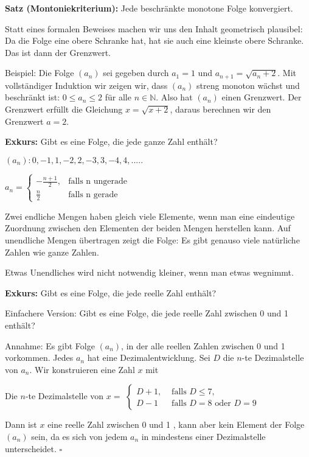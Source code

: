 \begin{frame}[fragile]
\textbf{Satz (Montoniekriterium):} Jede beschränkte monotone Folge konvergiert. \pause

Statt eines formalen Beweises machen wir uns den Inhalt geometrisch plausibel: \pause Da die Folge eine obere Schranke hat, hat sie auch eine kleinste obere Schranke. Das ist dann der Grenzwert. \pause

Beispiel: Die Folge $(a_n)$ sei gegeben durch $a_1 = 1$ und $a_{n+1} = \sqrt{a_n+2}$. Mit vollständiger Induktion wir zeigen wir, dass $(a_n)$ streng monoton wächst und beschränkt ist: $0 \le a_n \le 2$ für alle $n \in \mathbb{N}$. \pause
Also hat $(a_n)$ einen Grenzwert. \pause Der Grenzwert erfüllt die Gleichung $x = \sqrt{x+2}$,  daraus berechnen wir den Grenzwert $a = 2$. 

\end{frame}

\begin{frame}[fragile]
\textbf{Exkurs:} Gibt es eine Folge, die jede ganze Zahl enthält? \pause

$(a_n): 0,-1,1,-2,2,-3,3,-4,4,..... $ \pause

$a_n=\begin{cases}
 -\frac{n+1}{2},  & \text{falls n ungerade}\\
\frac{n}{2} & \text{falls n gerade }
\end{cases} $  \pause

Zwei endliche Mengen haben gleich viele Elemente, wenn man eine eindeutige Zuordnung zwischen den Elementen der beiden Mengen herstellen kann. \pause Auf unendliche Mengen übertragen zeigt die Folge: Es gibt genauso viele natürliche Zahlen wie ganze Zahlen. \pause

Etwas Unendliches wird nicht notwendig kleiner, wenn man etwas wegnimmt.

\end{frame}


\begin{frame}[fragile]
\textbf{Exkurs:} Gibt es eine Folge, die jede reelle Zahl enthält? \pause 

Einfachere Version: Gibt es eine Folge, die jede reelle Zahl zwischen 0 und 1 enthält? \pause

Annahme: Es gibt Folge $(a_n)$, in der alle reellen Zahlen zwischen 0 und 1 vorkommen. \pause Jedes $a_n$ hat eine Dezimalentwicklung. \pause Sei $D$ die $n$-te Dezimalstelle von $a_n$. \pause Wir konstruieren eine Zahl $x$ mit

Die $n$-te Dezimalstelle von $x = $ 
$\begin{cases}
D+1,  & \text{ falls } D \le 7,\\
D-1  & \text{ falls } D=8 \text{ oder } D=9 
\end{cases} $   \pause

Dann ist $x$ eine reelle Zahl zwischen 0 und 1 \pause, kann aber kein Element der Folge $(a_n)$ sein, da es sich von jedem $a_n$ in mindestens einer Dezimalstelle unterscheidet. \hfill $\square$

\end{frame}


